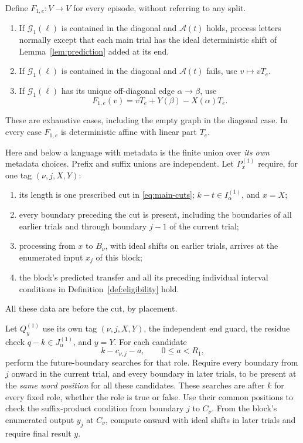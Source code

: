 Define \(F_{1,e}:V\to V\) for every episode, without referring to any split.
\begin{enumerate}[label=\textup{(\alph*)}]
\item If \(\mathcal G_1(\ell)\) is contained in the diagonal and
\(\mathcal A(t)\) holds, process letters normally except that each main trial
has the ideal deterministic shift of Lemma~\ref{lem:prediction} added at its end.
\item If \(\mathcal G_1(\ell)\) is contained in the diagonal and
\(\mathcal A(t)\) fails, use \(v\mapsto vT_e\).
\item If \(\mathcal G_1(\ell)\) has its unique off-diagonal edge
\(\alpha\to\beta\), use
\begin{equation}\label{eq:main-error}
                 F_{1,e}(v)=vT_e+Y(\beta)-X(\alpha)T_e.
\end{equation}
\end{enumerate}
These are exhaustive cases, including the empty graph in the diagonal case.
In every case \(F_{1,e}\) is deterministic affine with linear part \(T_e\).

Here and below a language with metadata is the finite union over
\emph{its own} metadata choices. Prefix and suffix unions are independent.
Let \(P_x^{(1)}\) require, for one tag \((\nu,j,X,Y)\):
\begin{enumerate}[label=\textup{(\roman*)}]
\item its length is one prescribed cut in \eqref{eq:main-cuts};
\(k-t\in I^{(1)}_\alpha\), and \(x=X\);
\item every boundary preceding the cut is present, including the boundaries
of all earlier trials and through boundary \(j-1\) of the current trial;
\item processing from \(x\) to \(B_\nu\), with ideal shifts on earlier trials,
arrives at the enumerated input \(x_j\) of this block;
\item the block's predicted transfer and all its preceding individual
interval conditions in Definition~\ref{def:eligibility} hold.
\end{enumerate}
All these data are before the cut, by placement.

Let \(Q_y^{(1)}\) use its own tag \((\nu,j,X,Y)\), the independent end guard,
the residue check \(q-k\in J^{(1)}_\alpha\), and \(y=Y\).
For each candidate
\begin{equation}\label{eq:main-role-origins}
                    k-c_{\nu,j}-a,\qquad 0\le a<R_1,
\end{equation}
perform the future-boundary searches for that role. Require every boundary
from \(j\) onward in the current trial, and every boundary in later trials,
to be present at the \emph{same word position} for all these candidates.
These searches are after \(k\) for every fixed role, whether the role is true
or false. Use their common positions to check the suffix-product condition
from boundary \(j\) to \(C_\nu\). From the block's enumerated output \(y_j\)
at \(C_\nu\), compute onward with ideal shifts in later trials and require
final result \(y\).

